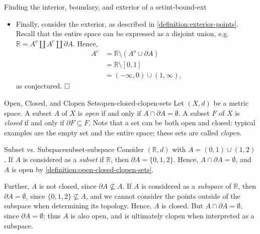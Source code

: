 \documentclass{article}
\renewcommand*\qedsymbol{\hfill\ensuremath{\Box}}
\numberwithin{equation}{section}
\numberwithin{enumi}{section}
\begin{document}
\begin{example}{Finding the interior, boundary, and exterior of a
        set}{int-bound-ext}
\begin{itemize}
            Now, we show that there are no other boundary points of $ A $ in $
            \mathbb{R} $. We know that $ \mathbb{R} = A^o \coprod \partial A
            \coprod A^e $, hence $ A^o \cup \partial A = \emptyset $, thus $ (0,
            1) \not\subset \partial A $. Without loss of generality for $ x < 0
            $, consider points $ x > 1 $. Therefore, there exists an $ \epsilon
            > 0 $ such that $ x = 1 + \epsilon $. Considering $ B(x, \epsilon/2)
            $, we can see that $ B(x, \epsilon/2) \subset A^c $, which implies
            that $ B(x, \epsilon/2) \cap A = \emptyset $. Thus, $ \{ 0, 1 \} =
            \partial A $.
        \item Finally, consider the exterior, as described in
            \cref{definition:exterior-points}. Recall that the entire space can
            be expressed as a disjoint union, e.g. $ \mathbb{R} = A^o \coprod
            A^e \coprod \partial A $. Hence,
            \begin{align}
                A^e &= \mathbb{R} \setminus \left( A^o \cup \partial A
                    \right) \\
                &= \mathbb{R} \setminus [0, 1] \\
                &= (-\infty, 0) \cup (1, \infty),
            \end{align}
            as conjectured. $ \qedsymbol $
    \end{itemize}
\end{example}
\begin{definition}{Open, Closed, and Clopen Sets}{open-closed-clopen-sets}
    Let $ (X, d) $ be a metric space. A subset $ A $ of $ X $ is \emph{open} if
    and only if $ A \cap \partial A = \emptyset $. A subset $ F $ of $ X $ is
    \emph{closed} if and only if $ \partial F \subseteq F $. Note that a set can
    be both open and closed: typical examples are the empty set and the entire
    space; these sets are called \emph{clopen}.
\end{definition}
\begin{example}{Subset vs. Subspace}{subset-subspace}
    Consider $ (\mathbb{R}, d) $ with $ A = (0, 1) \cup (1, 2) $. If $ A $ is
    considered as a \emph{subset} if $ \mathbb{R} $, then $ \partial A = \{0, 1,
    2 \} $. Hence, $ A \cap \partial A = \emptyset $, and $ A $ is open by
    \cref{definition:open-closed-clopen-sets}.

    Further, $ A $ is not closed, since $ \partial A \not\subseteq A $. If $ A $
    is considered as a \emph{subspace} of $ \mathbb{R} $, then $ \partial A =
    \emptyset $, since $ \{ 0, 1, 2 \} \not\subseteq A $, and we cannot consider
    the points outside of the subspace when determining its topology. Hence, $ A
    $ is closed. But $ A \cap \partial A = \emptyset $, since $ \partial A =
    \emptyset $; thus $ A $ is also open, and is ultimately clopen when
    interpreted as a subspace.
\end{example}
\end{document}
